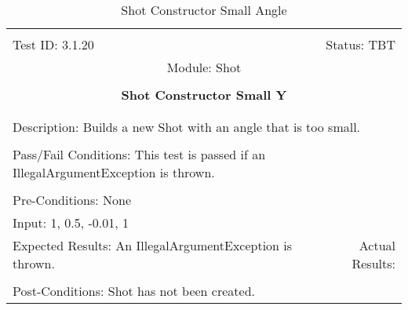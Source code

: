 \documentclass[titlepage]{article}
\begin{document}
\begin{center}%
\begin{table}
\begin{tabular}{|l r|}\hline&\\[-2mm]
	Test ID: 3.1.20	&Status: TBT\\[-3mm]
	\multicolumn{2}{|c|}{Module: Shot}\\&\\
	\multicolumn{2}{|c|}{\textbf{\large{Shot Constructor Small Y}}}\\&\\\hline&\\[-3mm]
	\multicolumn{2}{|p{\textwidth}|}{Description: Builds a new Shot with an angle that is too small.}\\[1mm]\hline&\\[-3mm]
	\multicolumn{2}{|p{\textwidth}|}{Pass/Fail Conditions: This test is passed if an IllegalArgumentException is thrown.}\\[1mm]\hline&\\[-3mm]
	\multicolumn{2}{|p{\textwidth}|}{Pre-Conditions: None}\\[4mm]
	\multicolumn{2}{|p{\textwidth}|}{Input: 1, 0.5, -0.01, 1}\\[2mm]\hline
	\multicolumn{1}{|p{0.49\textwidth}}{Expected Results: An IllegalArgumentException is thrown.}	&\multicolumn{1}{|p{0.45\textwidth}|}{Actual Results: }\\\hline&\\[-3mm]
	\multicolumn{2}{|p{\textwidth}|}{Post-Conditions: Shot has not been created.}\\\hline
\end{tabular}
\caption{Shot Constructor Small Angle}
\end{table}
\end{center}
\end{document}
